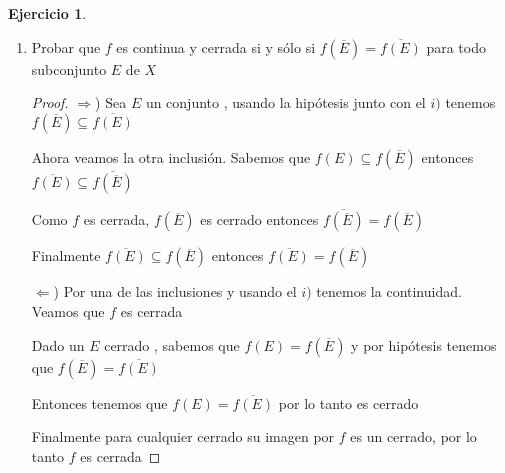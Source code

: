 \documentclass[11pt]{report}
\newcommand{\Ra}{\Rightarrow}
\newcommand{\ol}{\overline}
\theoremstyle{definition}
\newtheorem{ej}{Ejercicio}
\begin{document}
\begin{ej}
\begin{enumerate}
\begin{proof}
					Y por hipótesis sabemos que $f(\ol E) \subset \ol{f(E)}$

					Por lo tanto $f(x) \in \ol{f(E)}$, entonces tenemos una sucesión de elementos de $f(E)$ que converge a $f(x)$

					Ahora esta sucesión la podemos armar como subsucesión de $f(x_{n_k})$, si esto no fuera cierto, entonces existiría $n_{k_1}$ tal que $d(f(x_{n_{k}}),f(x)) > \epsilon \quad \forall n_k \geq n_{k_1}$.

					Pero nuestro conjunto $E$ tiene solamentes elementos $f(x_{n_k})$ por lo tanto no podría tener una sucesión de $E$ que converja a $f(x)$, lo cual es absurdo, entonces puedo armarme una sub-subsucesión $f(x_{n_{k_j}})$ que converja a $f(x)$

					Y por último, si $x_n$ nunca era $x$ entonces podemos repetír el argumento recién usado.

					Entonces teniendo $f(x_n)$ y tomando cualquier subsucesion $f(x_{n_k})$ pudimos encontrar una subsubsucesión $f(x_{n_{k_j}})$ que converje a $f(x)$, por lo tanto $f(x_n)$ converje a $f(x)$.

					Mostrando que $f$ es continua

				\end{proof}
				
				
			\item Probar que $f$ es continua y cerrada si y sólo si $f(\ol E) = \ol{f(E)}$ para todo subconjunto $E$ de $X$
				\begin{proof}
				$\Ra$) Sea $E$ un conjunto , usando la hipótesis junto con el $i)$ tenemos $f(\ol E) \subseteq \ol{f(E)}$

				Ahora veamos la otra inclusión. Sabemos que $f(E) \subseteq f(\ol E)$ entonces $\ol{f(E)} \subseteq \ol{f(\ol E)}$

				Como $f$ es cerrada, $f(\ol E)$ es cerrado entonces $\ol{f(\ol E)} = f(\ol E)$

				Finalmente $\ol{f(E)} \subseteq f(\ol E)$ entonces $\ol{f(E)} = f(\ol E)$

				$\Leftarrow$) Por una de las inclusiones y usando el $i)$ tenemos la continuidad. Veamos que $f$ es cerrada

				Dado un $E$ cerrado , sabemos que $f(E) = f(\ol E)$ y por hipótesis tenemos que $f(\ol E) = \ol{f(E)}$

				Entonces tenemos que $f(E) = \ol{f(E)}$ por lo tanto es cerrado

				Finalmente para cualquier cerrado su imagen por $f$ es un cerrado, por lo tanto $f$ es cerrada
				\end{proof}
		\end{enumerate}
	\end{ej}
\end{document}
